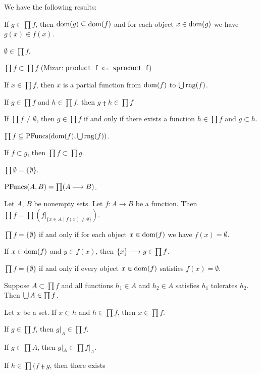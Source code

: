 \documentclass{article}
\begin{document}
We have the following results:
\begin{thm}
\item\label{card3:49} If $g\in\prod f$, then $\operatorname{dom}(g)\subseteq\operatorname{dom}(f)$ and
  for each object $x\in\operatorname{dom}(g)$ we have $g(x)\in f(x)$.
\item\label{card3:50} $\emptyset\in\prod f$.
\item\label{card3:51} $\prod f\subset\prod f$ (Mizar: \verb#product f c= sproduct f#)
\item\label{card3:52} If $x\in\prod f$, then $x$ is a partial function
  from $\operatorname{dom}(f)$ to $\bigcup\operatorname{rng}(f)$.
\item\label{card3:53} If $g\in\prod f$ and $h\in\prod f$, then
  $g\plusdot h\in\prod f$
\item\label{card3:54} If $\prod f\neq\emptyset$, then $g\in\prod f$ if
  and only if there exists a function $h\in\prod f$ and $g\subset h$.
\item\label{card3:55} $\prod f\subseteq\operatorname{PFuncs}(\operatorname{dom}(f),\bigcup\operatorname{rng}(f))$.
\item\label{card3:56} If $f\subset g$, then $\prod f\subset\prod g$.
\item\label{card3:57} $\prod\emptyset=\{\emptyset\}$.
\item\label{card3:58} $\operatorname{PFuncs}(A,B)=\prod(A\longmapsto B)$.
\item\label{card3:59} Let $A$, $B$ be nonempty sets. Let $f\colon A\to B$
  be a function. Then $\prod f=\prod(f|_{\{x\in A\mid f(x)\neq\emptyset\}})$.
\item\label{card3:60} $\prod f=\{\emptyset\}$ if and only if for each
  object $x\in\operatorname{dom}(f)$ we have $f(x)=\emptyset$.
\item\label{card3:61} If $x\in\operatorname{dom}(f)$ and $y\in f(x)$, then
  $\{x\}\longmapsto y\in\prod f$.
\item\label{card3:62} $\prod f=\{\emptyset\}$ if and only if every
  object $x\in\operatorname{dom}(f)$ satisfies $f(x)=\emptyset$.
\item\label{card3:63} Suppose $A\subset\prod f$ and all functions
  $h_{1}\in A$ and $h_{2}\in A$ satisfies $h_{1}$ tolerates $h_{2}$.
  Then $\bigcup A\in\prod f$.
\item\label{card3:64} Let $x$ be a set. If $x\subset h$ and $h\in\prod f$,
  then $x\in\prod f$.
\item\label{card3:65} If $g\in\prod f$, then $g|_{A}\in\prod f$.
\item\label{card3:66} If $g\in\prod A$, then $g|_{A}\in\prod f|_{A}$.
\item\label{card3:67} If $h\in\prod(f\plusdot g$, then there exists

\end{thm}
\end{document}
